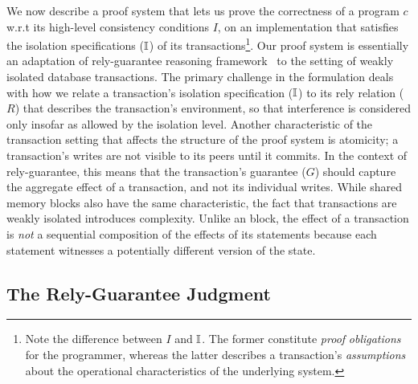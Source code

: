 We now describe a proof system that lets us prove the correctness of a
\txnimp program $c$ w.r.t its high-level consistency conditions $I$,
on an implementation that satisfies the isolation specifications
($\mathbb{I}$) of its transactions\footnote{Note the difference between $I$
  and $\mathbb{I}$. The former constitute \emph{proof} \emph{obligations} for
  the programmer, whereas the latter describes a transaction's
  \emph{assumptions} about the operational characteristics of the
  underlying system.}.  Our proof system is essentially an adaptation
of rely-guarantee reasoning framework~\cite{rgjones} to the setting of
weakly isolated database transactions.  The primary challenge in the
formulation deals with how we relate a transaction's isolation
specification ($\mathbb{I}$) to its rely relation ($R$) that describes the
transaction's environment, so that interference is considered only
insofar as allowed by the isolation level.  Another characteristic of
the transaction setting that affects the structure of the proof system
is atomicity; a transaction's writes are not visible to its peers
until it commits.  In the context of rely-guarantee, this means that
the transaction's guarantee ($G$) should capture the aggregate effect
of a transaction, and not its individual writes.  While shared memory
 blocks also have the same characteristic, the fact that
transactions are weakly isolated introduces complexity.  Unlike an
 block, the effect of a transaction is \emph{not} a
sequential composition of the effects of its statements because each
statement witnesses a potentially different version of the state.

\subsection{The Rely-Guarantee Judgment}
\label{sec:rely-guarantee}




